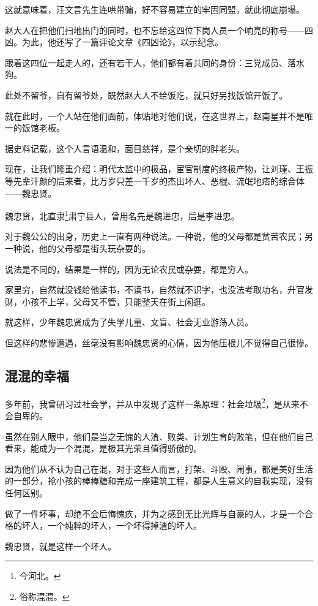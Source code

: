 \begin{multicols}{\theparacolNo}
		这就意味着，汪文言先生连哄带骗，好不容易建立的牢固同盟，就此彻底崩塌。

		赵大人在把他们扫地出门的同时，也不忘给这四位下岗人员一个响亮的称号——四凶。为此，他还写了一篇评论文章《四凶论》，以示纪念。

		跟着这四位一起走人的，还有若干人，他们都有着共同的身份：三党成员、落水狗。

		此处不留爷，自有留爷处，既然赵大人不给饭吃，就只好另找饭馆开饭了。

		就在此时，一个人站在他们面前，体贴地对他们说，在这世界上，赵南星并不是唯一的饭馆老板。

		据史料记载，这个人言语温和，面目慈祥，是个亲切的胖老头。

		现在，让我们隆重介绍：明代太监中的极品，宦官制度的终极产物，让刘瑾、王振等先辈汗颜的后来者，比万岁只差一千岁的杰出坏人、恶棍、流氓地痞的综合体——魏忠贤。

		魏忠贤，北直隶\footnote{今河北。}肃宁县人，曾用名先是魏进忠，后是李进忠。

		对于魏公公的出身，历史上一直有两种说法。一种说，他的父母都是贫苦农民；另一种说，他的父母都是街头玩杂耍的。

		说法是不同的，结果是一样的，因为无论农民或杂耍，都是穷人。

		家里穷，自然就没钱给他读书，不读书，自然就不识字，也没法考取功名，升官发财，小孩不上学，父母又不管，只能整天在街上闲逛。

		就这样，少年魏忠贤成为了失学儿童、文盲、社会无业游荡人员。

		但这样的悲惨遭遇，丝毫没有影响魏忠贤的心情，因为他压根儿不觉得自己很惨。

		\subsection{混混的幸福}
		多年前，我曾研习过社会学，并从中发现了这样一条原理：社会垃圾\footnote{俗称混混。}，是从来不会自卑的。

		虽然在别人眼中，他们是当之无愧的人渣、败类、计划生育的败笔，但在他们自己看来，能成为一个混混，是极其光荣且值得骄傲的。

		因为他们从不认为自己在混，对于这些人而言，打架、斗殴、闹事，都是美好生活的一部分，抢小孩的棒棒糖和完成一座建筑工程，都是人生意义的自我实现，没有任何区别。

		做了一件坏事，却绝不会后悔愧疚，并为之感到无比光辉与自豪的人，才是一个合格的坏人，一个纯粹的坏人，一个坏得掉渣的坏人。

		魏忠贤，就是这样一个坏人。


\end{multicols}
